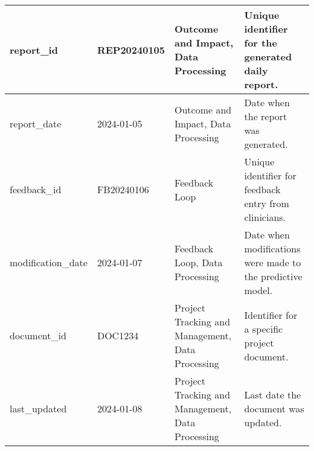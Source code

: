 \begin{longtable}{|L{0.2\textwidth}|L{0.2\textwidth}|L{0.2\textwidth}|L{0.4\textwidth}|}
\hline
report\_id & REP20240105 & Outcome and Impact, Data Processing & Unique identifier for the generated daily report. \\
\hline
report\_date & 2024-01-05 & Outcome and Impact, Data Processing & Date when the report was generated. \\
\hline
feedback\_id & FB20240106 & Feedback Loop & Unique identifier for feedback entry from clinicians. \\
\hline
modification\_date & 2024-01-07 & Feedback Loop, Data Processing & Date when modifications were made to the predictive model. \\
\hline
document\_id & DOC1234 & Project Tracking and Management, Data Processing & Identifier for a specific project document. \\
\hline
last\_updated & 2024-01-08 & Project Tracking and Management, Data Processing & Last date the document was updated. \\
\hline

\end{longtable}
